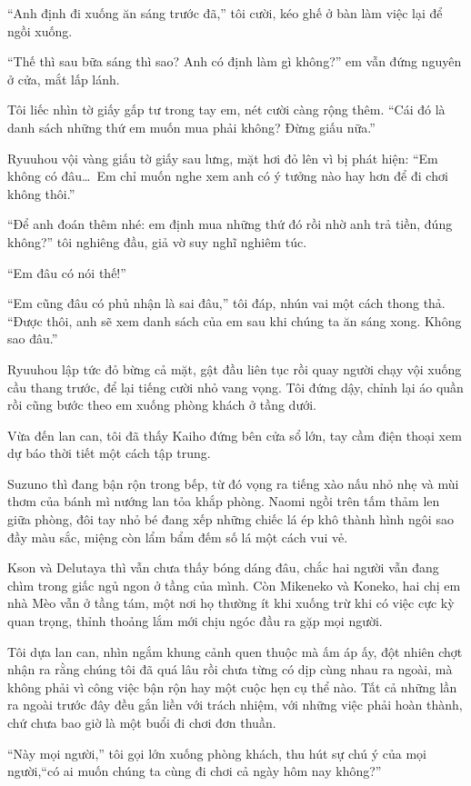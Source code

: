 ﻿\documentclass[../main.tex]{subfiles}
\begin{document}
``Anh định đi xuống ăn sáng trước đã,'' tôi cười, kéo ghế ở bàn làm việc lại để ngồi xuống.

``Thế thì sau bữa sáng thì sao? Anh có định làm gì không?'' em vẫn đứng nguyên ở cửa, mắt lấp lánh.

Tôi liếc nhìn tờ giấy gấp tư trong tay em, nét cười càng rộng thêm. ``Cái đó là danh sách những thứ em muốn mua phải không? Đừng giấu nữa.''

Ryuuhou vội vàng giấu tờ giấy sau lưng, mặt hơi đỏ lên vì bị phát hiện: ``Em không có đâu\dots\ Em chỉ muốn nghe xem anh có ý tưởng nào hay hơn để đi chơi không thôi.''

``Để anh đoán thêm nhé: em định mua những thứ đó rồi nhờ anh trả tiền, đúng không?'' tôi nghiêng đầu, giả vờ suy nghĩ nghiêm túc.

``Em đâu có nói thế!''

``Em cũng đâu có phủ nhận là sai đâu,'' tôi đáp, nhún vai một cách thong thả. ``Được thôi, anh sẽ xem danh sách của em sau khi chúng ta ăn sáng xong. Không sao đâu.''

Ryuuhou lập tức đỏ bừng cả mặt, gật đầu liên tục rồi quay người chạy vội xuống cầu thang trước, để lại tiếng cười nhỏ vang vọng. Tôi đứng dậy, chỉnh lại áo quần rồi cũng bước theo em xuống phòng khách ở tầng dưới.

Vừa đến lan can, tôi đã thấy Kaiho đứng bên cửa sổ lớn, tay cầm điện thoại xem dự báo thời tiết một cách tập trung.

Suzuno thì đang bận rộn trong bếp, từ đó vọng ra tiếng xào nấu nhỏ nhẹ và mùi thơm của bánh mì nướng lan tỏa khắp phòng. Naomi ngồi trên tấm thảm len giữa phòng, đôi tay nhỏ bé đang xếp những chiếc lá ép khô thành hình ngôi sao đầy màu sắc, miệng còn lẩm bẩm đếm số lá một cách vui vẻ.

Kson và Delutaya thì vẫn chưa thấy bóng dáng đâu, chắc hai người vẫn đang chìm trong giấc ngủ ngon ở tầng của mình. Còn Mikeneko và Koneko, hai chị em nhà Mèo vẫn ở tầng tám, một nơi họ thường ít khi xuống trừ khi có việc cực kỳ quan trọng, thỉnh thoảng lắm mới chịu ngóc đầu ra gặp mọi người.

Tôi dựa lan can, nhìn ngắm khung cảnh quen thuộc mà ấm áp ấy, đột nhiên chợt nhận ra rằng chúng tôi đã quá lâu rồi chưa từng có dịp cùng nhau ra ngoài, mà không phải vì công việc bận rộn hay một cuộc hẹn cụ thể nào. Tất cả những lần ra ngoài trước đây đều gắn liền với trách nhiệm, với những việc phải hoàn thành, chứ chưa bao giờ là một buổi đi chơi đơn thuần.

``Này mọi người,'' tôi gọi lớn xuống phòng khách, thu hút sự chú ý của mọi người,``có ai muốn chúng ta cùng đi chơi cả ngày hôm nay không?''
\end{document}
